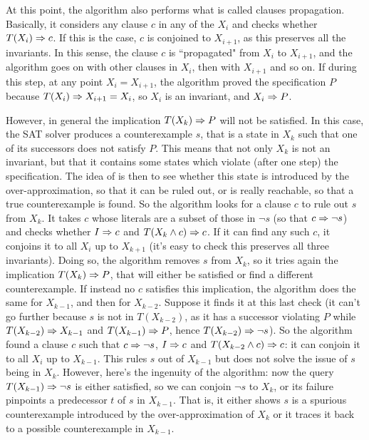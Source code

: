 At this point, the algorithm also performs what is called clauses propagation. Basically, it considers any clause $c$ in any of the $X_i$ and checks whether $T(X_i) \Rightarrow c$. If this is the case, $c$ is conjoined to $X_{i+1}$, as this preserves all the invariants. In this sense, the clause $c$ is ``propagated" from $X_i$ to $X_{i+1}$, and the algorithm goes on with other clauses in $X_i$, then with $X_{i+1}$ and so on. If during this step, at any point $X_i = X_{i+1}$, the algorithm proved the specification $P$ because $T(X_i) \Rightarrow X_{i+1} = X_i$, so $X_i$ is an invariant, and $X_i \Rightarrow P$.

However, in general the implication $T(X_k) \Rightarrow P$ will not be satisfied. In this case, the SAT solver produces a counterexample $s$, that is a state in $X_k$ such that one of its successors does not satisfy $P$. This means that not only $X_k$ is not an invariant, but that it contains some states which violate (after one step) the specification. The idea of  is then to see whether this state is introduced by the over-approximation, so that it can be ruled out, or is really reachable, so that a true counterexample is found.
So the algorithm looks for a clause $c$ to rule out $s$ from $X_k$. It takes $c$ whose literals are a subset of those in $\lnot s$ (so that $c \Rightarrow \lnot s$) and checks whether $I \Rightarrow c$ and $T(X_k \land c) \Rightarrow c$. If it can find any such $c$, it conjoins it to all $X_i$ up to $X_{k+1}$ (it's easy to check this preserves all three invariants). Doing so, the algorithm removes $s$ from $X_k$, so it tries again the implication $T(X_k) \Rightarrow P$, that will either be satisfied or find a different counterexample.
If instead no $c$ satisfies this implication, the algorithm does the same for $X_{k-1}$, and then for $X_{k-2}$. Suppose it finds it at this last check (it can't go further because $s$ is not in $T(X_{k-2})$, as it has a successor violating $P$ while $T(X_{k-2}) \Rightarrow X_{k-1}$ and $T(X_{k-1}) \Rightarrow P$, hence $T(X_{k-2}) \Rightarrow \lnot s$). So the algorithm found a clause $c$ such that $c \Rightarrow \lnot s$, $I \Rightarrow c$ and $T(X_{k-2} \land c) \Rightarrow c$: it can conjoin it to all $X_i$ up to $X_{k-1}$. This rules $s$ out of $X_{k-1}$ but does not solve the issue of $s$ being in $X_{k}$. However, here's the ingenuity of the algorithm: now the query $T(X_{k-1}) \Rightarrow \lnot s$ is either satisfied, so we can conjoin $\lnot s$ to $X_k$, or its failure pinpoints a predecessor $t$ of $s$ in $X_{k-1}$.
That is, it either shows $s$ is a spurious counterexample introduced by the over-approximation of $X_k$ or it traces it back to a possible counterexample in $X_{k-1}$.

